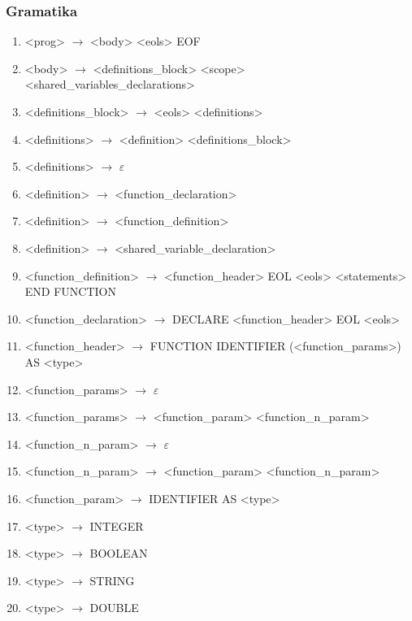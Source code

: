 \subsubsection{Gramatika}
\begin{normalsize}
\begin{enumerate}
\item <prog> $\rightarrow$ <body> <eols> EOF
\item <body> $\rightarrow$ <definitions\_block> <scope> <shared\_variables\_declarations>

\item <definitions\_block> $\rightarrow$ <eols> <definitions>

\item <definitions> $\rightarrow$ <definition> <definitions\_block>
\item <definitions> $\rightarrow$ $\varepsilon$

\item <definition> $\rightarrow$ <function\_declaration>
\item <definition> $\rightarrow$ <function\_definition>
\item <definition> $\rightarrow$ <shared\_variable\_declaration>

\item <function\_definition> $\rightarrow$ <function\_header> EOL <eols> <statements> END FUNCTION
\item <function\_declaration> $\rightarrow$ DECLARE <function\_header> EOL <eols>

\item <function\_header> $\rightarrow$ FUNCTION IDENTIFIER (<function\_params>) AS <type>

\item <function\_params> $\rightarrow$ $\varepsilon$
\item <function\_params> $\rightarrow$ <function\_param> <function\_n\_param>

\item <function\_n\_param> $\rightarrow$ $\varepsilon$
\item <function\_n\_param> $\rightarrow$ <function\_param> <function\_n\_param>

\item <function\_param> $\rightarrow$ IDENTIFIER AS <type>


\item <type> $\rightarrow$ INTEGER
\item <type> $\rightarrow$ BOOLEAN
\item <type> $\rightarrow$ STRING
\item <type> $\rightarrow$ DOUBLE


\end{enumerate}
\end{normalsize}
